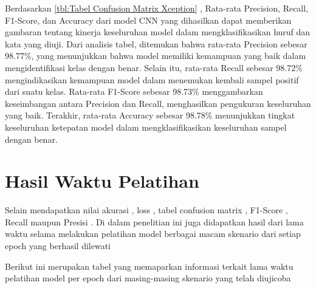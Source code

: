 Berdasarkan \ref{tbl:Tabel Confusion Matrix Xception} , Rata-rata Precision, Recall, F1-Score, dan Accuracy dari model CNN yang dihasilkan dapat memberikan gambaran tentang kinerja keseluruhan model dalam mengklasifikasikan huruf dan kata yang diuji. Dari analisis tabel, ditemukan bahwa rata-rata Precision sebesar 98.77\%, yang menunjukkan bahwa model memiliki kemampuan yang baik dalam mengidentifikasi kelas dengan benar. Selain itu, rata-rata Recall sebesar 98.72\% mengindikasikan kemampuan model dalam menemukan kembali sampel positif dari suatu kelas. Rata-rata F1-Score sebesar 98.73\% menggambarkan keseimbangan antara Precision dan Recall, menghasilkan pengukuran keseluruhan yang baik. Terakhir, rata-rata Accuracy sebesar 98.78\% menunjukkan tingkat keseluruhan ketepatan model dalam mengklasifikasikan keseluruhan sampel dengan benar.


\section{Hasil Waktu Pelatihan}
Selain mendapatkan nilai akurasi , loss , tabel confusion matrix , F1-Score , Recall maupun Presisi . Di dalam penelitian ini juga didapatkan hasil dari lama waktu selama melakukan pelatihan model berbagai macam skenario dari setiap epoch yang berhasil dilewati 

Berikut ini merupakan tabel yang memaparkan informasi terkait lama waktu pelatihan model per epoch dari masing-masing skenario yang telah diujicoba 

